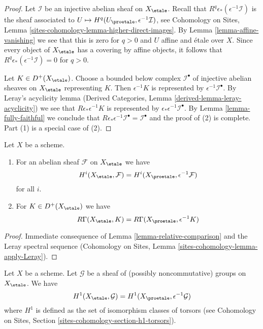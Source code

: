 \begin{proof}
Let $\mathcal{I}$ be an injective abelian sheaf on $X_\etale$.
Recall that $R^q\epsilon_*(\epsilon^{-1}\mathcal{I})$ is the sheaf associated
to $U \mapsto H^q(U_\proetale, \epsilon^{-1}\mathcal{I})$, see
Cohomology on Sites, Lemma \ref{sites-cohomology-lemma-higher-direct-images}.
By Lemma \ref{lemma-affine-vanishing} we see that this is zero for $q > 0$
and $U$ affine and \'etale over $X$. Since every object of
$X_\etale$ has a covering by affine objects, it follows that
$R^q\epsilon_*(\epsilon^{-1}\mathcal{I}) = 0$ for $q > 0$.

\medskip\noindent
Let $K \in D^+(X_\etale)$. Choose a bounded below complex $\mathcal{I}^\bullet$
of injective abelian sheaves on $X_\etale$ representing $K$.
Then $\epsilon^{-1}K$ is represented by $\epsilon^{-1}\mathcal{I}^\bullet$.
By Leray's acyclicity lemma (Derived Categories, Lemma
\ref{derived-lemma-leray-acyclicity}) we see that $R\epsilon_*\epsilon^{-1}K$
is represented by $\epsilon_*\epsilon^{-1}\mathcal{I}^\bullet$.
By Lemma \ref{lemma-fully-faithful} we conclude that
$R\epsilon_*\epsilon^{-1}\mathcal{I}^\bullet = \mathcal{I}^\bullet$
and the proof of (2) is complete. Part (1) is a special case of (2).
\end{proof}

\begin{lemma}
\label{lemma-compare-cohomology}
Let $X$ be a scheme.
\begin{enumerate}
\item For an abelian sheaf $\mathcal{F}$ on $X_\etale$ we have
$$
H^i(X_\etale, \mathcal{F}) =
H^i(X_\proetale, \epsilon^{-1}\mathcal{F})
$$
for all $i$.
\item For $K \in D^+(X_\etale)$ we have
$$
R\Gamma(X_\etale, K) = R\Gamma(X_\proetale, \epsilon^{-1}K)
$$
\end{enumerate}
\end{lemma}

\begin{proof}
Immediate consequence of Lemma \ref{lemma-relative-comparison} and
the Leray spectral sequence (Cohomology on Sites, Lemma
\ref{sites-cohomology-lemma-apply-Leray}).
\end{proof}

\begin{lemma}
\label{lemma-compare-cohomology-nonabelian}
Let $X$ be a scheme. Let $\mathcal{G}$ be a sheaf of (possibly
noncommutative) groups on $X_\etale$. We have
$$
H^1(X_\etale, \mathcal{G}) =
H^1(X_\proetale, \epsilon^{-1}\mathcal{G})
$$
where $H^1$ is defined as the set of isomorphism classes of
torsors (see
Cohomology on Sites, Section \ref{sites-cohomology-section-h1-torsors}).
\end{lemma}

